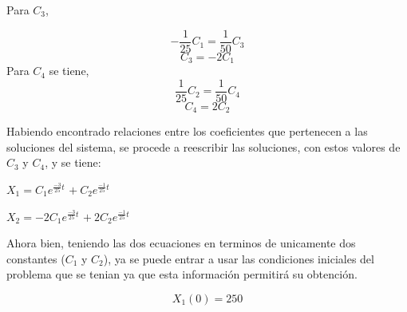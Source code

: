 \documentclass[titlepage]{article}
\begin{document}
                Para $C_3$,
                
                    \begin{equation*}
                        -\frac{1}{25}C_1 = \frac{1}{50}C_3 
                    \end{equation*}\vspace{0.1cm}
                    \begin{equation*}
                        C_3 = -2C_1
                    \end{equation*}\vspace{0.2cm}
                Para $C_4$ se tiene, 
                    \begin{equation*}
                        \frac{1}{25}C_2 = \frac{1}{50}C_4 
                    \end{equation*}\vspace{0.1cm}
                    \begin{equation*}
                        C_4 = 2C_2
                    \end{equation*}\vspace{0.2cm}
                
                Habiendo encontrado relaciones entre los coeficientes que pertenecen a las soluciones del sistema, se procede a reescribir las soluciones, con estos valores de $C_3$ y $C_4$, y se tiene:
                
                    \begin{center}
                    
                        $X_1 = C_1e^{\frac{-3}{25}t}$ $+~C_2e^{\frac{-1}{25}t}$
    
                    \end{center}
                
                    \begin{center}
                    
                        $X_2 = -2C_1e^{\frac{-3}{25}t}$ $+~2C_2e^{\frac{-1}{25}t}$
    
                    \end{center}    
                Ahora bien, teniendo las dos ecuaciones en terminos de unicamente dos constantes ($C_1$ y $C_2$), ya se puede entrar a usar las condiciones iniciales del problema que se tenian ya que esta información permitirá su obtención.
                
                    \begin{equation*}
                        X_1(0) = 250
                    \end{equation*}
            
\end{document}
